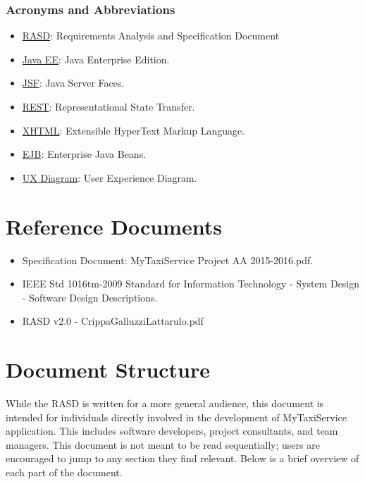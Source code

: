 \subsubsection{Acronyms and Abbreviations}
\begin{itemize}
	\item \underline{RASD}: Requirements Analysis and Specification Document
	\item \underline{Java EE}: Java Enterprise Edition.
	\item \underline{JSF}: Java Server Faces.
	\item \underline{REST}: Representational State Transfer.
	\item \underline{XHTML}: Extensible HyperText Markup Language.
	\item \underline{EJB}: Enterprise Java Beans.
	\item \underline{UX Diagram}: User Experience Diagram.
\end{itemize}

\section{Reference Documents}
\begin{itemize}
	\item Specification Document: MyTaxiService Project AA 2015-2016.pdf.
	\item IEEE Std 1016tm-2009 Standard for Information Technology - System Design - Software Design Descriptions.
	\item RASD v2.0 - CrippaGalluzziLattarulo.pdf
\end{itemize}

\section{Document Structure}
While the RASD is written for a more general audience, this document is intended for individuals directly involved in the development of MyTaxiService application. This includes software developers, project consultants, and team managers. This document is not meant to be read sequentially; users are encouraged to jump to any section they find relevant. Below is a brief overview of each part of the document.

